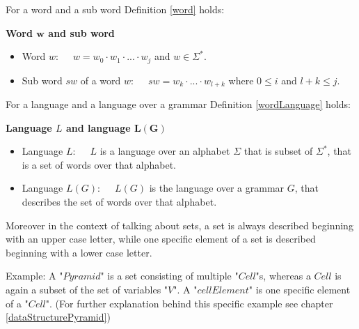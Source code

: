 For a word and a sub word Definition \ref{word} holds:
\begin{DefGrey} \label{word} \textbf{Word $\mathbf{w}$ and sub word}
	\begin{itemize}[leftmargin=1cm]
		\item Word $w$:~~~$w = w_0\cdot w_1\cdot ...\cdot w_j$ and $w \in \Sigma^*$.
		\item Sub word $sw$ of a word $w$:~~~$sw = w_k\cdot ...\cdot w_{l+k}$ where $0\leq i$ and $l+k \leq j$.
	\end{itemize}
\end{DefGrey}
\noindent For a language and a language over a grammar Definition \ref{wordLanguage} holds:
\begin{DefGrey}\label{wordLanguage} \textbf{Language $L$ and language $\mathbf{L(G)}$}~
	\begin{itemize}[leftmargin=1cm]
		\item Language $L$:~~~$L$ is a language over an alphabet $\Sigma$ that is subset of $\Sigma^*$, that is a set of words over that alphabet. 
		\item Language $L(G)$:~~~$L(G)$ is the language over a grammar $G$, that describes the set of words over that alphabet.
	\end{itemize}
\end{DefGrey}
\noindent Moreover in the context of talking about sets, a set is always described beginning with an upper case letter, while one specific element of a set is described beginning with a lower case letter. \\
\begin{testexample}
	Example: A "$Pyramid$" is a set consisting of multiple "$Cell$"s, whereas a $Cell$ is again a subset of the set of variables "$V$". A "$cellElement$" is one specific element of a "$Cell$". (For further explanation behind this specific example see chapter \ref{dataStructurePyramid})
\end{testexample}~\\


\pagebreak
